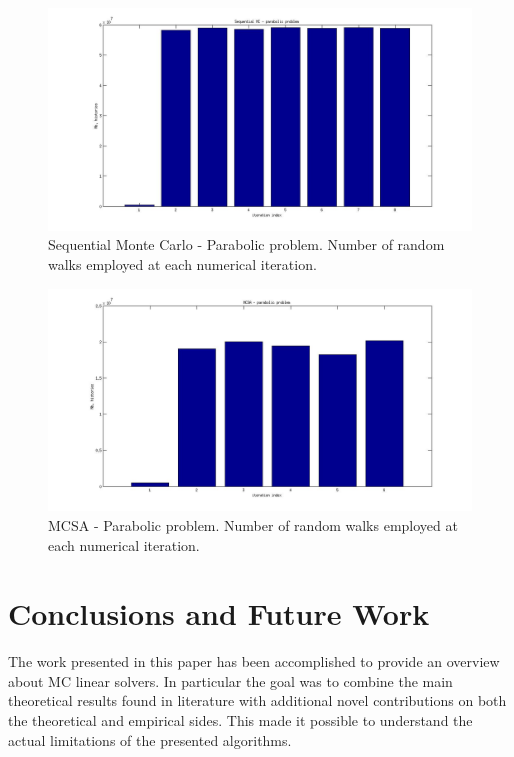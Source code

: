 \documentclass[a4paper,10pt]{article}
\begin{document}
\begin{figure}[h!]
  \centering
    \includegraphics[width=\textwidth]{SEQ_parabolic.jpg}
      \caption{Sequential Monte Carlo - Parabolic problem. Number of random
walks
employed at each
numerical iteration.}
\label{MCSA_parabolic}
\end{figure}


\begin{figure}[h!]
  \centering
    \includegraphics[width=\textwidth]{MCSA_parabolic.jpg}
      \caption{MCSA - Parabolic problem. Number of random walks
employed at each
numerical iteration.}
\label{MCSA_parabolic}
\end{figure}

\section{Conclusions and Future Work}

The work presented in this paper has been accomplished to provide an overview
about MC linear solvers. In particular the goal was to combine the main
theoretical results found in literature with additional novel contributions on
both the theoretical and empirical sides. This made it possible to understand
the actual limitations of the presented algorithms.
\end{document}
